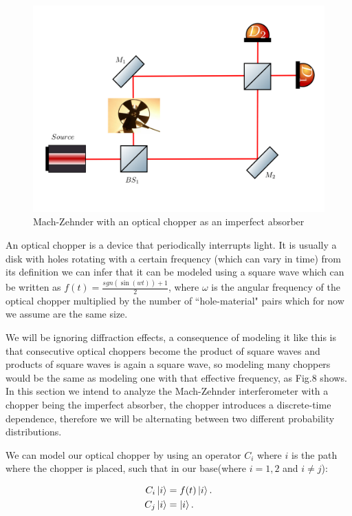 \documentclass[12pt]{book}
\begin{document}
 \begin{figure}[h!]
\centering
\includegraphics[width=\linewidth]{images/machzenhderchopper.png}
\caption{Mach-Zehnder with an optical chopper as an imperfect absorber}
\label{fig:BS2}
\end{figure}
An optical chopper is a device that periodically interrupts light. It is usually a disk with holes rotating with a certain frequency (which can vary in time) from its definition we can infer that it can be modeled using a square wave which can be written as  $f(t)=\frac{sgn(\sin(wt))+1}{2}$, where $\omega$ is the angular frequency of the optical chopper multiplied by the number of ``hole-material" pairs which for now we assume are the same size. 
  
We will be ignoring diffraction effects, a consequence of modeling it like this is that consecutive optical choppers become the product of square waves and products of square waves is again a square wave, so modeling many choppers would be the same as modeling one with that effective frequency, as Fig.8 shows. In this section we intend to analyze the Mach-Zehnder interferometer with a chopper being the imperfect absorber, the chopper introduces a discrete-time dependence, therefore we will be alternating between two different probability distributions.


We can model our optical chopper by using an operator $C_{i}$ where $i$ is the path where the chopper is placed, such that in our base(where $i=1,2$ and $i \neq j$):

\begin{align}
C_{i}\ket{i}&=f(t)\ket{i}.\\
C_{j}\ket{i}&=\ket{i}.
\end{align}
\end{document}
